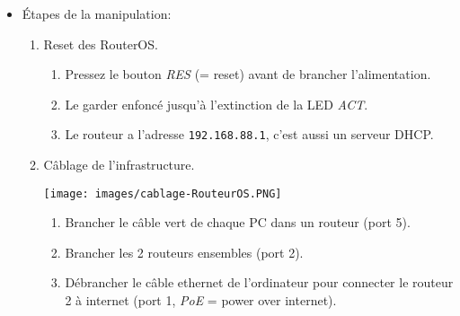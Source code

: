\documentclass[a4paper]{article}
\begin{document}
\begin{itemize}





\item Étapes de la manipulation:
\begin{enumerate}


    \item Reset des RouterOS.
    \begin{example}
        \begin{enumerate}
            \item Pressez le bouton \textit{RES} (= reset) avant de brancher l’alimentation.
            \item Le garder enfoncé jusqu'à l'extinction de la LED \textit{ACT}.
            \item Le routeur a l'adresse \texttt{192.168.88.1}, c'est aussi un serveur DHCP.
        \end{enumerate}
    \end{example}


    \item Câblage de l’infrastructure.
    \begin{example}
        \begin{center}
            \texttt{[image: images/cablage-RouteurOS.PNG]}
        \end{center}
        \begin{enumerate}
            \item Brancher le câble vert de chaque PC dans un routeur (port 5).
            \item Brancher les 2 routeurs ensembles (port 2).
            \item Débrancher le câble ethernet de l'ordinateur pour connecter le routeur 2 à internet (port 1, \textit{PoE} = power over internet).
        \end{enumerate}
    \end{example}



\end{enumerate}
\end{itemize}
\end{document}
